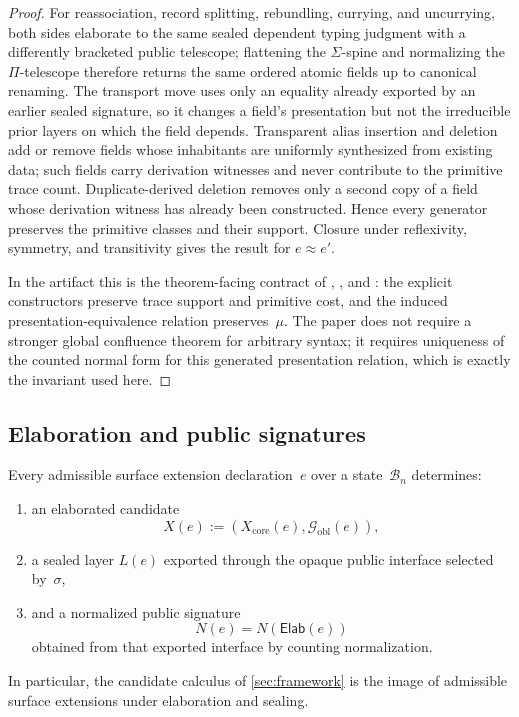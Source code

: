 \documentclass{lmcs}
\newcommand{\B}{\mathcal{B}}
\newcommand{\Gcal}{\mathcal{G}}
\begin{document}
\begin{proof}
For reassociation, record splitting, rebundling, currying, and uncurrying, both sides elaborate to the same sealed dependent typing judgment with a differently bracketed public telescope; flattening the $\Sigma$-spine and normalizing the $\Pi$-telescope therefore returns the same ordered atomic fields up to canonical renaming. The transport move uses only an equality already exported by an earlier sealed signature, so it changes a field's presentation but not the irreducible prior layers on which the field depends. Transparent alias insertion and deletion add or remove fields whose inhabitants are uniformly synthesized from existing data; such fields carry derivation witnesses and never contribute to the primitive trace count. Duplicate-derived deletion removes only a second copy of a field whose derivation witness has already been constructed. Hence every generator preserves the primitive classes and their support. Closure under reflexivity, symmetry, and transitivity gives the result for $e\approx e'$.

In the artifact this is the theorem-facing contract of , , and : the explicit  constructors preserve trace support and primitive cost, and the induced presentation-equivalence relation preserves~$\mu$. The paper does not require a stronger global confluence theorem for arbitrary syntax; it requires uniqueness of the counted normal form for this generated presentation relation, which is exactly the invariant used here.
\end{proof}

\subsection{Elaboration and public signatures}

\begin{thm}
\label{thm:elaboration}
Every admissible surface extension declaration~$e$ over a state~$\B_n$ determines:
\begin{enumerate}
  \item an elaborated candidate
  \[
    X(e) := (X_{\mathrm{core}}(e), \Gcal_{\mathrm{obl}}(e)),
  \]
  \item a sealed layer $L(e)$ exported through the opaque public interface selected by~$\sigma$,
  \item and a normalized public signature
  \[
    N(e) = N(\mathsf{Elab}(e))
  \]
  obtained from that exported interface by counting normalization.
\end{enumerate}
In particular, the candidate calculus of \autoref{sec:framework} is the image of admissible surface extensions under elaboration and sealing.
\end{thm}
\end{document}
